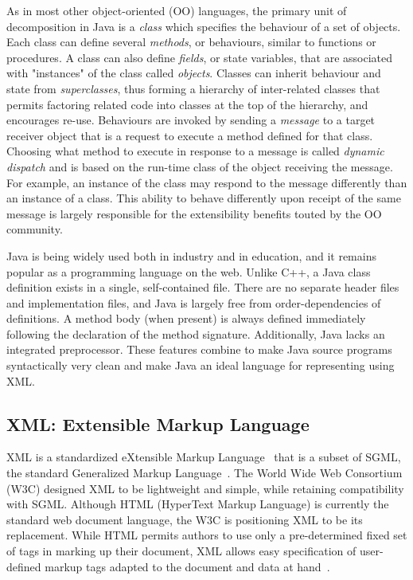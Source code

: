 \documentclass{article}
\begin{document}
   As in most other object-oriented (OO) languages, the primary unit of
   decomposition in Java is a \emph{class} which specifies the behaviour of a
   set of objects.  Each class can define several \emph{methods}, or
   behaviours, similar to functions or procedures. A class can also
   define \emph{fields}, or state variables, that are associated with
   "instances" of the class called \emph{objects}. Classes can inherit
   behaviour and state from \emph{superclasses}, thus forming a hierarchy of
   inter-related classes that permits factoring related code into
   classes at the top of the hierarchy, and encourages re-use.
   Behaviours are invoked by sending a \emph{message} to a target receiver
   object that is a request to execute a method defined for that class.
   Choosing what method to execute in response to a message is called
   \emph{dynamic dispatch} and is based on the run-time class of the object
   receiving the message.  For example, an instance of the 
   class may respond to the  message differently than an instance
   of a  class.  This ability to behave differently upon receipt
   of the same message is largely responsible
   for the extensibility benefits touted by the OO community.
    

   Java is being widely used both in industry and in education, and it
   remains popular as a programming language on the web.  Unlike C++, a
   Java class definition exists in a single, self-contained file.  There
   are no separate header files and implementation files, and Java is
   largely free from order-dependencies of definitions.  A method body
   (when present) is always defined immediately following the
   declaration of the method signature.   Additionally,
   Java lacks an integrated preprocessor.  These features combine to
   make Java source programs syntactically very clean and make Java an
   ideal language for representing using XML.

\subsection{XML: Extensible Markup Language}

XML is a standardized eXtensible Markup Language~\cite{XML}
that is a subset of
SGML, the standard Generalized Markup Language~\cite{SGML}.  The World Wide Web
Consortium (W3C) designed XML to be lightweight and simple, while
retaining compatibility with SGML.  Although HTML (HyperText Markup
Language) is currently the standard web document language, the W3C is positioning XML
to be its replacement.  While HTML permits authors to use only a
pre-determined fixed set of tags in marking up their document, XML
allows easy specification of user-defined markup tags adapted to the
document and data at hand~\cite{LaTeXWeb,XML-Handbook}.
\end{document}
